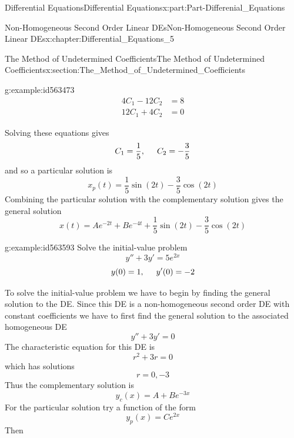 \documentclass[oneside,10pt,]{book}
\numberwithin{equation}{section}
\newcommand{\amp}{&}
\begin{document}
\begin{partptx}{Differential Equations}{}{Differential Equations}{}{}{x:part:Part-Differenial_Equations}
\begin{chapterptx}{Non-Homogeneous Second Order Linear DEs}{}{Non-Homogeneous Second Order Linear DEs}{}{}{x:chapter:Differential_Equations_5}
\begin{sectionptx}{The Method of Undetermined Coefficients}{}{The Method of Undetermined Coefficients}{}{}{x:section:The_Method_of_Undetermined_Coefficients}
\begin{example}{}{g:example:id563473}
\begin{align*}
4C_1-12C_2 \amp = 8\\
12C_1+4C_2 \amp = 0
\end{align*}
%
\par
Solving these equations gives%
\begin{equation*}
C_1=\frac{1}{5}, \hspace{5mm} C_2=-\frac{3}{5}
\end{equation*}
and so a particular solution is%
\begin{equation*}
x_p(t)=\frac{1}{5}\sin(2t)-\frac{3}{5}\cos(2t)
\end{equation*}
Combining the particular solution with the complementary solution gives the general solution%
\begin{equation*}
x(t)=Ae^{-2t}+Be^{-4t}+\frac{1}{5}\sin(2t)-\frac{3}{5}\cos(2t)
\end{equation*}
%
\end{example}
\begin{example}{}{g:example:id563593}%
Solve the initial-value problem%
\begin{equation*}
y''+3y'=5e^{2x}
\end{equation*}
%
\begin{equation*}
y(0)=1,\hspace{5mm} y'(0)=-2
\end{equation*}
%
\par\smallskip%
\noindent\hypertarget{g:solution:id563595}{}To solve the initial-value problem we have to begin by finding the general solution to the DE. Since this DE is a non-homogeneous second order DE with constant coefficients we have to first find the general solution to the associated homogeneous DE%
\begin{equation*}
y''+3y'=0
\end{equation*}
The characteristic equation for this DE is%
\begin{equation*}
r^2+3r=0
\end{equation*}
which has solutions%
\begin{equation*}
r=0, -3
\end{equation*}
Thus the complementary solution is%
\begin{equation*}
y_c(x)=A+Be^{-3x}
\end{equation*}
For the particular solution try a function of the form%
\begin{equation*}
y_p(x)=Ce^{2x}
\end{equation*}
Then%
\par
%
\begin{align*}

\end{align*}
\end{example}
\end{sectionptx}
\end{chapterptx}
\end{partptx}
\end{document}
